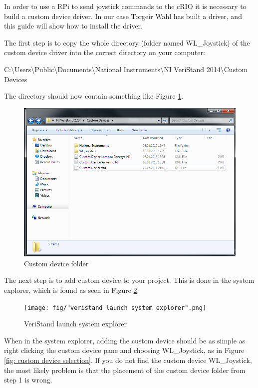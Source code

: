 \documentclass[a4paper,twoside,english]{report}
\begin{document}
In order to use a RPi to send joystick commands to the cRIO it is
necessary to build a custom device driver. In our case Torgeir Wahl
has built a driver, and this guide will show how to install the driver.

The first step is to copy the whole directory (folder named WL\_Joystick)
of the custom device driver into the correct directory on your computer:

C:\textbackslash{}Users\textbackslash{}Public\textbackslash{}Documents\textbackslash{}National
Instruments\textbackslash{}NI VeriStand 2014\textbackslash{}Custom
Devices

The directory should now contain something like Figure \ref{fig: custom device folder}.

\begin{figure}[!h]
\centering \includegraphics[scale=0.45]{fig/custom_devices_folder.png}
\caption{Custom device folder}

\label{fig: custom device folder} 
\end{figure}

The next step is to add custom device to your project. This is done
in the system explorer, which is found as seen in Figure \ref{fig: veristand launch system explorer}.

\begin{figure}[!h]
\centering \texttt{[image: fig/"veristand launch system explorer".png]}
\caption{VeriStand launch system explorer}

\label{fig: veristand launch system explorer} 
\end{figure}

When in the system explorer, adding the custom device should be as
simple as right clicking the custom device pane and choosing WL\_Joystick,
as in Figure \ref{fig: custom device selection}. If you do not find
the custom device WL\_Joystick, the most likely problem is that the
placement of the custom device folder from step 1 is wrong.
\end{document}
